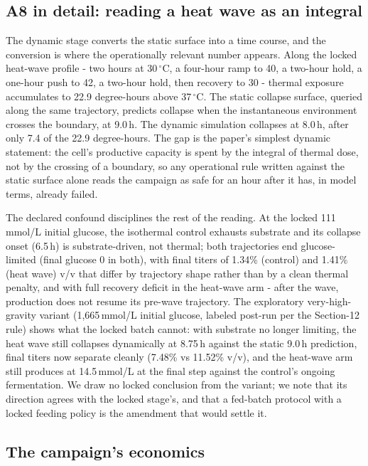 \documentclass[12pt]{article}
\begin{document}
\subsection{A8 in detail: reading a heat wave as an integral}

The dynamic stage converts the static surface into a time course, and
the conversion is where the operationally relevant number appears.
Along the locked heat-wave profile - two hours at 30\,$^{\circ}$C, a
four-hour ramp to 40, a two-hour hold, a one-hour push to 42, a
two-hour hold, then recovery to 30 - thermal exposure accumulates to
22.9 degree-hours above 37\,$^{\circ}$C. The static collapse surface,
queried along the same trajectory, predicts collapse when the
instantaneous environment crosses the boundary, at 9.0\,h. The
dynamic simulation collapses at 8.0\,h, after only 7.4 of the 22.9
degree-hours. The gap is the paper's simplest dynamic statement: the
cell's productive capacity is spent by the integral of thermal dose,
not by the crossing of a boundary, so any operational rule written
against the static surface alone reads the campaign as safe for an
hour after it has, in model terms, already failed.

The declared confound disciplines the rest of the reading. At the
locked 111\,mmol/L initial glucose, the isothermal control exhausts
substrate and its collapse onset (6.5\,h) is substrate-driven, not
thermal; both trajectories end glucose-limited (final glucose 0 in
both), with final titers of 1.34\% (control) and 1.41\% (heat wave)
v/v that differ by trajectory shape rather than by a clean thermal
penalty, and with full recovery deficit in the heat-wave arm - after
the wave, production does not resume its pre-wave trajectory. The
exploratory very-high-gravity variant (1{,}665\,mmol/L initial
glucose, labeled post-run per the Section-12 rule) shows what the
locked batch cannot: with substrate no longer limiting, the heat wave
still collapses dynamically at 8.75\,h against the static 9.0\,h
prediction, final titers now separate cleanly (7.48\% vs 11.52\%
v/v), and the heat-wave arm still produces at 14.5\,mmol/L at the
final step against the control's ongoing fermentation. We draw no
locked conclusion from the variant; we note that its direction agrees
with the locked stage's, and that a fed-batch protocol with a locked
feeding policy is the amendment that would settle it.


\subsection{The campaign's economics}
\end{document}
